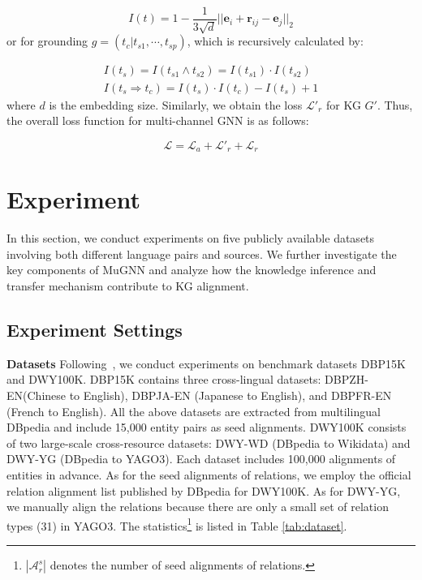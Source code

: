 \documentclass[11pt,a4paper]{article}
\newcommand{\para}[1]{\vspace{0.01in}\noindent\textbf{#1 }}
\begin{document}
\begin{equation}
	I(t)=1-\frac{1}{3\sqrt{d}}||\mathbf{e}_i+\mathbf{r}_{ij}-\mathbf{e}_j||_2
\end{equation}
or for grounding $g=(t_c|t_{s1},\cdots,t_{sp})$, which is recursively calculated by:

\begin{equation}
	\begin{split}
		I(t_s) = I(t_{s1}\wedge t_{s2})=I(t_{s1})\cdot I(t_{s2}) \\
		I(t_s \Rightarrow t_c)=I(t_s)\cdot I(t_c) - I(t_s) + 1
	\end{split}
\end{equation}
where $d$ is the embedding size. Similarly, we obtain the loss $\mathcal{L}'_r$ for KG $G'$. Thus, the overall loss function for multi-channel GNN is as follows:

\begin{equation}
	\mathcal{L} = \mathcal{L}_a + \mathcal{L}'_r + \mathcal{L}_r
\end{equation}

\section{Experiment}
In this section, we conduct experiments on five publicly available datasets involving both different language pairs and sources. We further investigate the key components of MuGNN and analyze how the knowledge inference and transfer mechanism contribute to KG alignment.

\subsection{Experiment Settings}

\para{Datasets} Following~\citet{sun2017cross, sun2018bootstrapping}, we conduct experiments on benchmark datasets DBP15K and DWY100K. DBP15K contains three cross-lingual datasets: DBP{\tiny ZH-EN}(Chinese to English), DBP{\tiny JA-EN} (Japanese to English), and DBP{\tiny FR-EN} (French to English). All the above datasets are extracted from multilingual DBpedia and include 15,000 entity pairs as seed alignments. DWY100K consists of two large-scale cross-resource datasets: DWY-WD (DBpedia to Wikidata) and DWY-YG (DBpedia to YAGO3). Each dataset includes 100,000 alignments of entities in advance. As for the seed alignments of relations, we employ the official relation alignment list published by DBpedia for DWY100K. As for DWY-YG, we manually align the relations because there are only a small set of relation types (31) in YAGO3. The statistics\footnote{$|\mathcal{A}_r^s|$ denotes the number of seed alignments of relations.} is listed in Table \ref{tab:dataset}.
\end{document}
